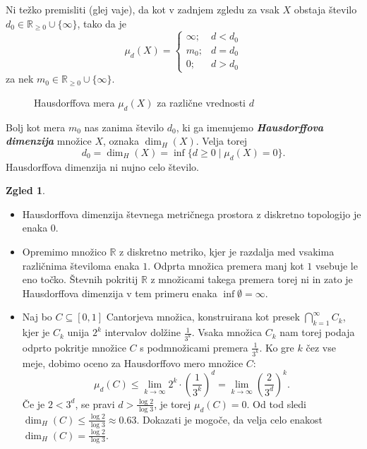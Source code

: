 \documentclass[11pt]{book}
\def\RR{\mathbb{R}}
\def\definicija{\color{rdeca}\bf\em}
\def\literatura{\color{modra}}
\def\vaje{{\literatura (glej vaje)}}
\theoremstyle{definition}
\theoremstyle{zgled}
\newtheorem*{zgled}{Zgled}
\theoremstyle{odprtproblem}
\theoremstyle{domacanaloga}
\theoremstyle{izrek}
\begin{document}
Ni težko premisliti \vaje, da kot v zadnjem zgledu za vsak $X$ obstaja število $d_0 \in \RR_{\geq 0} \cup \{ \infty \}$, tako da je
\[
\mu_d(X) = 
\begin{cases}
\infty; & d < d_0 \\
m_0; & d = d_0 \\
0; & d > d_0
\end{cases}
\]
za nek $m_0 \in \RR_{\geq 0} \cup \{ \infty \}$. 

\begin{figure}[t]
\centering
{}
\caption{Hausdorffova mera $\mu_d(X)$ za različne vrednosti $d$}
\end{figure}

Bolj kot mera $m_0$ nas zanima število $d_0$, ki ga imenujemo {\definicija Hausdorffova dimenzija} množice $X$, oznaka $\dim_H(X)$. Velja torej
\[
d_0 = \dim_H(X) = \inf \{ d \geq 0 \mid \mu_d(X) = 0 \}.
\]
Hausdorffova dimenzija ni nujno celo število.

\begin{zgled}
\begin{itemize}
    \item Hausdorffova dimenzija števnega metričnega prostora z diskretno topologijo je enaka $0$.

    \item Opremimo množico $\RR$ z diskretno metriko, kjer je razdalja med vsakima različnima številoma enaka $1$. Odprta množica premera manj kot $1$ vsebuje le eno točko. Števnih pokritij $\RR$ z množicami takega premera torej ni in zato je Hausdorffova dimenzija v tem primeru enaka $\inf \emptyset = \infty$.

    \item Naj bo $C \subseteq [0,1]$ Cantorjeva množica, konstruirana kot presek $\bigcap_{k = 1}^\infty C_k$, kjer je $C_k$ unija $2^k$ intervalov dolžine $\frac{1}{3^k}$. Vsaka množica $C_k$ nam torej podaja odprto pokritje množice $C$ s podmnožicami premera $\frac{1}{3^k}$. Ko gre $k$ čez vse meje, dobimo oceno za Hausdorffovo mero množice $C$:
\[
\mu_d(C) \leq \lim_{k \to \infty} 2^k \cdot \left( \frac{1}{3^k} \right)^d = \lim_{k \to \infty} \left( \frac{2}{3^d} \right)^k.
\]
Če je $2 < 3^d$, se pravi $d > \frac{\log 2}{\log 3}$, je torej $\mu_d(C) = 0$. Od tod sledi $\dim_H(C) \leq \frac{\log 2}{\log 3} \approx 0.63$. Dokazati je mogoče, da velja celo enakost $\dim_H(C) = \frac{\log 2}{\log 3}$.
\end{itemize}

\end{zgled}
\end{document}
